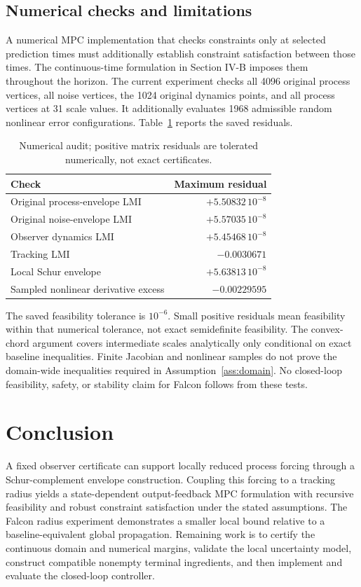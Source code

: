 \documentclass[11pt,a4paper]{article}
\numberwithin{equation}{section}
\theoremstyle{remark}\newtheorem{remark}{Remark}
\begin{document}
\subsection{Numerical checks and limitations}
A numerical MPC implementation that checks constraints only at selected prediction times must additionally establish constraint satisfaction between those times. The continuous-time formulation in Section IV-B imposes them throughout the horizon.
The current experiment checks all 4096 original process vertices, all noise vertices, the 1024 original dynamics points, and all process vertices at 31 scale values. It additionally evaluates 1968 admissible random nonlinear error configurations. Table~\ref{tab:residuals} reports the saved residuals.
\begin{table}[htbp]\centering
\caption{Numerical audit; positive matrix residuals are tolerated numerically, not exact certificates.}
\begin{tabular}{lr}\toprule
Check & Maximum residual\\\midrule
Original process-envelope LMI & $+5.50832\,10^{-8}$\\
Original noise-envelope LMI & $+5.57035\,10^{-8}$\\
Observer dynamics LMI & $+5.45468\,10^{-8}$\\
Tracking LMI & $-0.0030671$\\
Local Schur envelope & $+5.63813\,10^{-8}$\\
Sampled nonlinear derivative excess & $-0.00229595$\\\bottomrule
\end{tabular}\label{tab:residuals}
\end{table}
The saved feasibility tolerance is $10^{-6}$. Small positive residuals mean feasibility within that numerical tolerance, not exact semidefinite feasibility. The convex-chord argument covers intermediate scales analytically only conditional on exact baseline inequalities. Finite Jacobian and nonlinear samples do not prove the domain-wide inequalities required in Assumption~\ref{ass:domain}. No closed-loop feasibility, safety, or stability claim for Falcon follows from these tests.

\section{Conclusion}
A fixed observer certificate can support locally reduced process forcing through a Schur-complement envelope construction. Coupling this forcing to a tracking radius yields a state-dependent output-feedback MPC formulation with recursive feasibility and robust constraint satisfaction under the stated assumptions. The Falcon radius experiment demonstrates a smaller local bound relative to a baseline-equivalent global propagation. Remaining work is to certify the continuous domain and numerical margins, validate the local uncertainty model, construct compatible nonempty terminal ingredients, and then implement and evaluate the closed-loop controller.
\end{document}
